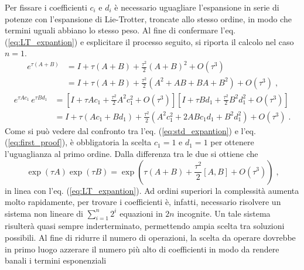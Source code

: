 Per fissare i coefficienti $c_{i}$ e $d_{i}$ è necessario uguagliare l'espansione in serie di potenze con l'espansione di Lie-Trotter, troncate allo stesso ordine, in modo che termini uguali abbiano lo stesso peso.
Al fine di confermare l'eq. (\ref{eq:LT_expantion}) e esplicitare il processo seguito, si riporta il calcolo nel caso $n=1$.
\begin{equation}
    \begin{split}
        e^{\tau ({A} + {B})}
        & = I + \tau(A + B) + \frac{\tau^{2}}{2} (A + B)^2 + O(\tau^{3})  \\
        & = I + \tau(A + B) + \frac{\tau^{2}}{2} (A^2 + AB + BA + B^2) + O(\tau^{3}) \; \text{,}
    \end{split}
    \label{eq:std_expantion}
\end{equation}
\begin{equation}
    \begin{split}
        e^{\tau A c_{1}} \, e^{\tau B d_{1}} 
        & = \left[ I + \tau A c_{1}  + \frac{\tau^{2}}{2} A^2 c_{1}^2 + O(\tau^{3}) \right] \left[  I + \tau B d_{1} + \frac{\tau^{2}}{2} B^2 d_{1}^2+ O(\tau^{3}) \right] \\
        & = I + \tau (A c_{1} + B d_{1} ) + \frac{\tau^{2}}{2} (A^2 c_{1}^2 + 2  A B c_{1}d_{1} + B^2 d_{1}^2) + O(\tau^{3}) \; \text{.}
    \end{split}
    \label{eq:first_proof}
\end{equation}
Come si può vedere dal confronto tra l'eq. (\ref{eq:std_expantion}) e l'eq. (\ref{eq:first_proof}), è obbligatoria la scelta $c_{1} = 1$ e $d_{1} = 1$ per ottenere l'uguaglianza al primo ordine.
Dalla differenza tra le due si ottiene che 
\begin{equation}
         \exp \left(\tau A\right)  \exp \left(\tau B\right) =  \exp \left(\tau ({A} + {B}) + \frac{\tau^{2}}{2} [A, B] + O(\tau^{3})\right) \; \text{,}
    \label{eq:proof}
\end{equation}
in linea con l'eq. (\ref{eq:LT_expantion}). Ad ordini superiori la complessità aumenta molto rapidamente, per trovare i coefficienti è, infatti, necessario risolvere un sistema non lineare di $\sum_{i=1}^{n} 2^{i} $ equazioni in $2n$ incognite. Un tale sistema risulterà quasi sempre inderterminato, permettendo ampia scelta tra soluzioni possibili. Al fine di ridurre il numero di operazioni, la scelta da operare dovrebbe in primo luogo azzerare il numero più alto di coefficienti in modo da rendere banali i termini esponenziali %
